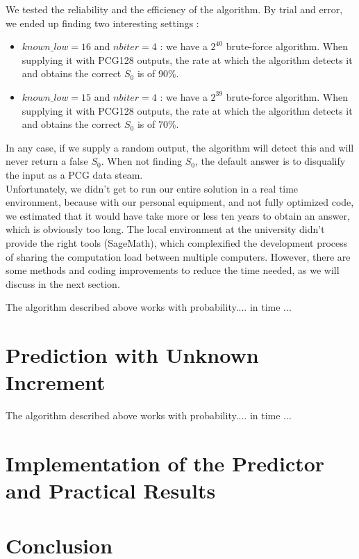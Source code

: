 \documentclass[preprint]{iacrtrans}
\begin{document}
We tested the reliability and the efficiency of the algorithm. By trial and error, we ended up finding two interesting settings :
\begin{itemize}
    \item $known\_low = 16$ and $nbiter = 4$ : we have a $2^{40}$ brute-force algorithm. When supplying it with PCG128 outputs, the rate at which the algorithm detects it and obtains the correct $S_0$ is of 90\%.
    \item $known\_low = 15$ and $nbiter = 4$ : we have a $2^{39}$ brute-force algorithm. When supplying it with PCG128 outputs, the rate at which the algorithm detects it and obtains the correct $S_0$ is of 70\%.
\end{itemize}

In any case, if we supply a random output, the algorithm will detect this and will never return a false $S_0$. When not finding $S_0$, the default answer is to disqualify the input as a PCG data steam.\\

Unfortunately, we didn't get to run our entire solution in a real time environment, because with our personal equipment, and not fully optimized code, we estimated that it would have take more or less ten years to obtain an answer, which is obviously too long.
The local environment at the university didn't provide the right tools (SageMath), which complexified the development process of sharing the computation load between multiple computers. However, there are some methods and coding improvements to reduce the time needed, as we will discuss in the next section.

\begin{theorem}
  The algorithm described above works with probability.... in time ...
\end{theorem}

\section{Prediction with Unknown Increment}

\begin{theorem}
  The algorithm described above works with probability.... in time ...
\end{theorem}

\section{Implementation of the Predictor and Practical Results}

\section{Conclusion}




\end{document}
